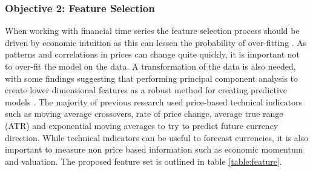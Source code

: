 \documentclass[11pt, a4paper]{article}
\begin{document}
\subsubsection{Objective 2: Feature Selection} 
When working with financial time series the feature selection process should be driven by economic intuition as this can lessen the probability of over-fitting \cite{Arnott2018}. \newline As patterns and correlations in prices can change quite quickly, it is important not to over-fit the model on the data. A transformation of the data is also needed, with some findings suggesting that performing principal component analysis to create lower dimensional features as a robust method for creating predictive models \cite{Song2010}. The majority of previous research used price-based technical indicators \cite{Kara2011} \cite{Wang2014} \cite{Patel2015} \cite{Gunduz2017} such as moving average crossovers, rate of price change, average true range (ATR) and exponential moving averages to try to predict future currency direction. While technical indicators can be useful to forecast currencies, it is also important to measure non price based information such as economic momentum and valuation. The proposed feature set is outlined in table \ref{table:feature}.
\begin{table}[h] 
\centering      %
\caption{Model Features} %
\label{table:feature} %
\end{table} 
\end{document}
